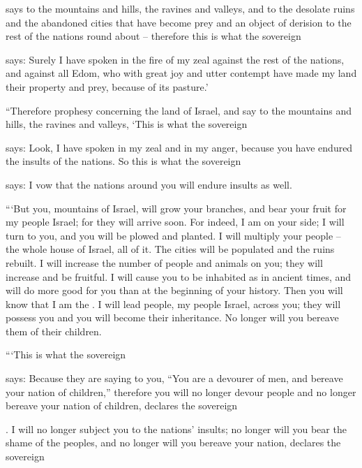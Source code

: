 {{}
says to the mountains
and hills,
the ravines
and valleys,
and to the desolate
ruins
and the abandoned
cities
that have
become
prey
and an object of derision
to the rest
of the nations
round about –
therefore
this is what
the sovereign

{}
says: Surely
I have spoken
in the fire
of my zeal
against
the rest
of the nations,
and against
all
Edom,
who
with great joy
and utter
contempt
have made
my land
their
property
and prey,
because
of its pasture.’
\par }{\PP {}“Therefore
prophesy
concerning
the land
of Israel,
and say
to the mountains
and hills,
the ravines
and valleys,
‘This is what
the sovereign

{}
says: Look,
I have spoken
in my zeal
and in my anger,
because
you have endured
the insults
of the nations.
So
this is what
the sovereign

{}
says: I
vow
that the nations
around
you will endure
insults as well.
\par }{\PP {}“‘But you,
mountains
of Israel,
will grow
your branches,
and bear
your fruit
for my people
Israel;
for
they will arrive soon.
For indeed,
I am
on your side; I will turn
to
you, and you will be plowed
and planted.
I will multiply
your people –
the whole
house
of Israel,
all
of it. The cities
will be populated
and the ruins
rebuilt.
I will increase
the number of people
and animals
on
you; they will increase
and be fruitful.
I will cause you to be inhabited
as in ancient times,
and will do more good
for you than at the beginning
of your history. Then you will know
that
I
am the
{}.
I will lead
people,
my people
Israel,
across you; they will possess
you and you will become
their inheritance.
No
longer
will you bereave them of their children.
\par }{\PP {}“‘This is what
the sovereign

{}
says: Because
they are saying
to you, “You are a devourer
of men,
and bereave
your nation
of children,”
therefore
you will no
longer
devour
people
and no longer
bereave
your nation
of children, declares
the sovereign

{}.
I
will no
longer
subject
you to the nations’
insults;
no longer
will you bear
the shame
of the peoples,
and no
longer will
you bereave
your nation,
declares
the sovereign

}

